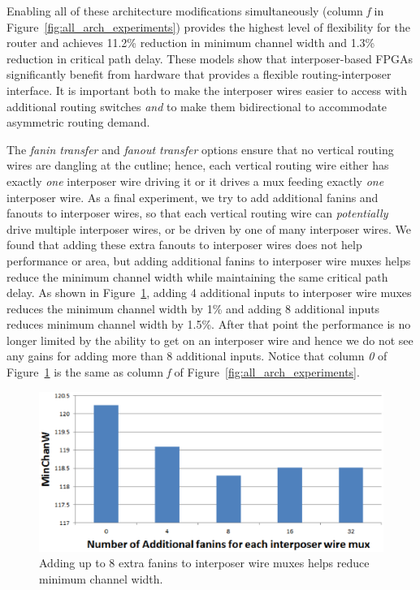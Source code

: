 \documentclass{sig-alternate-2013}
\begin{document}
Enabling all of these architecture modifications simultaneously (column \textit{f} in Figure~\ref{fig:all_arch_experiments}) provides the highest level of flexibility for the router and achieves 11.2\% reduction in minimum channel width and 1.3\% reduction in critical path delay. These models show that interposer-based FPGAs significantly benefit from hardware that provides a flexible routing-interposer interface. It is important both to make the interposer wires easier to access with additional routing switches \textit{and} to make them bidirectional to accommodate asymmetric routing demand.

The \textit{fanin transfer} and \textit{fanout transfer} options ensure that no vertical routing wires are dangling at the cutline; hence, each vertical routing wire either has exactly \textit{one} interposer wire driving it or it drives a mux feeding exactly \textit{one} interposer wire. As a final experiment, we try to add additional fanins and fanouts to interposer wires, so that each vertical routing wire can \textit{potentially} drive multiple interposer wires, or be driven by one of many interposer wires. We found that adding these extra fanouts to interposer wires does not help performance or area, but adding additional fanins to interposer wire muxes helps reduce the minimum channel width while maintaining the same critical path delay. As shown in Figure~\ref{fig:additional_fanins}, adding 4 additional inputs to interposer wire muxes reduces the minimum channel width by 1\% and adding 8 additional inputs reduces minimum channel width by 1.5\%. After that point the performance is no longer limited by the ability to get on an interposer wire and hence we do not see any gains for adding more than 8 additional inputs. Notice that column \textit{0} of Figure~\ref{fig:additional_fanins} is the same as column \textit{f} of Figure~\ref{fig:all_arch_experiments}.

\begin{figure}[!h]
\centering
\includegraphics[width=\linewidth]{additional_fanins.eps}
\caption{Adding up to 8 extra fanins to interposer wire muxes helps reduce minimum channel width.}
\label{fig:additional_fanins}
\end{figure}
\end{document}
